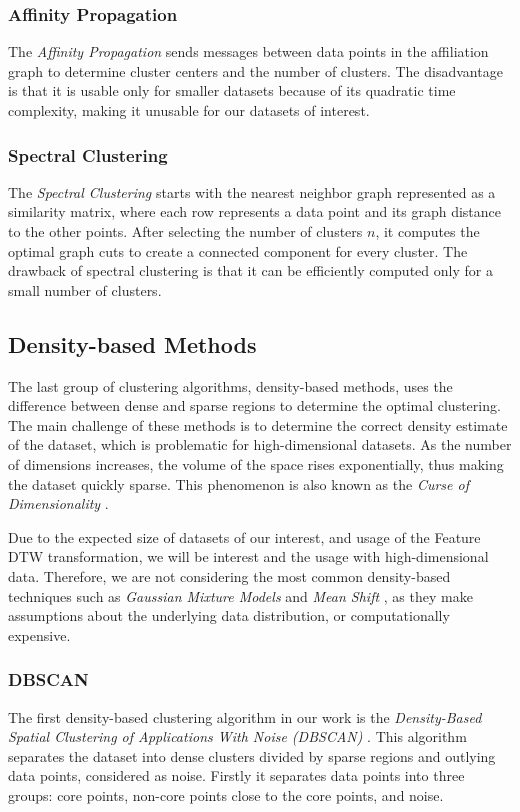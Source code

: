 \subsubsection{Affinity Propagation}
The \textit{Affinity Propagation} \cite{vis:affini} sends messages between data points in the affiliation graph to determine cluster centers and the number of clusters. The disadvantage is that it is usable only for smaller datasets because of its quadratic time complexity, making it unusable for our datasets of interest.

\subsubsection{Spectral Clustering}
The \textit{Spectral Clustering} \cite{vis:spectral} starts with the nearest neighbor graph represented as a similarity matrix, where each row represents a data point and its graph distance to the other points. After selecting the number of clusters $n$, it computes the optimal graph cuts to create a connected component for every cluster. The drawback of spectral clustering is that it can be efficiently computed only for a small number of clusters.

\subsection{Density-based Methods}
The last group of clustering algorithms, density-based methods, uses the difference between dense and sparse regions to determine the optimal clustering. 
The main challenge of these methods is to determine the correct density estimate of the dataset, which is problematic for high-dimensional datasets. As the number of dimensions increases, the volume of the space rises exponentially, thus making the dataset quickly sparse. This phenomenon is also known as the \textit{Curse of Dimensionality} \cite{exp:curse-of-dim}.

Due to the expected size of datasets of our interest, and usage of the Feature DTW transformation, we will be interest and the usage with high-dimensional data. Therefore, we are not considering the most common density-based techniques such as \textit{Gaussian Mixture Models} \cite{vis:gauss-mixt} and \textit{Mean Shift} \cite{vis:mean-shift}, as they make assumptions about the underlying data distribution, or computationally expensive.

\subsubsection{DBSCAN}
The first density-based clustering algorithm in our work is the \textit{Density-Based Spatial Clustering of Applications With Noise (DBSCAN)} \cite{vis:dbscan}. This algorithm separates the dataset into dense clusters divided by sparse regions and outlying data points, considered as noise. Firstly it separates data points into three groups: core points, non-core points close to the core points, and noise.

